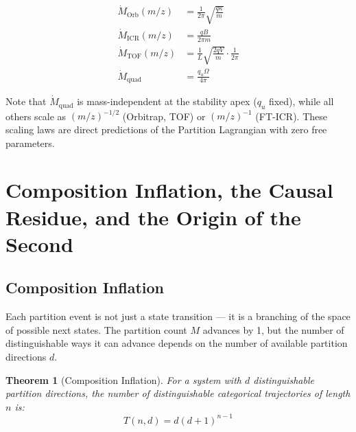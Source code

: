 \documentclass[11pt,twocolumn,a4paper]{article}
\theoremstyle{plain}
\newtheorem{theorem}{Theorem}[section]
\theoremstyle{definition}
\theoremstyle{remark}
\begin{document}
\begin{align}
    \dot{M}_{\mathrm{Orb}}(m/z) &= \frac{1}{2\pi}\sqrt{\frac{q\kappa}{m}}
    \label{eq:mdot_orb} \\
    \dot{M}_{\mathrm{ICR}}(m/z) &= \frac{qB}{2\pi m}
    \label{eq:mdot_icr} \\
    \dot{M}_{\mathrm{TOF}}(m/z) &= \frac{1}{L}\sqrt{\frac{2qV}{m}} \cdot
    \frac{1}{2\pi}
    \label{eq:mdot_tof} \\
    \dot{M}_{\mathrm{quad}} &= \frac{q_u \Omega}{4\pi}
    \label{eq:mdot_quad}
\end{align}

Note that $\dot{M}_{\mathrm{quad}}$ is mass-independent at the stability apex
($q_u$ fixed), while all others scale as $(m/z)^{-1/2}$ (Orbitrap, TOF) or
$(m/z)^{-1}$ (FT-ICR). These scaling laws are direct predictions of the
Partition Lagrangian with zero free parameters.


\section{Composition Inflation, the Causal Residue, and the Origin of the
Second}
\label{sec:composition}

\subsection{Composition Inflation}
\label{subsec:comp_inflation}

Each partition event is not just a state transition --- it is a branching of the
space of possible next states. The partition count $M$ advances by 1, but the
number of distinguishable ways it can advance depends on the number of available
partition directions $d$.

\begin{theorem}[Composition Inflation]
\label{thm:comp_inflation}
For a system with $d$ distinguishable partition directions, the number of
distinguishable categorical trajectories of length $n$ is:
\begin{equation}
    T(n,d) = d(d+1)^{n-1}
    \label{eq:comp_inflation}
\end{equation}
\end{theorem}
\end{document}
